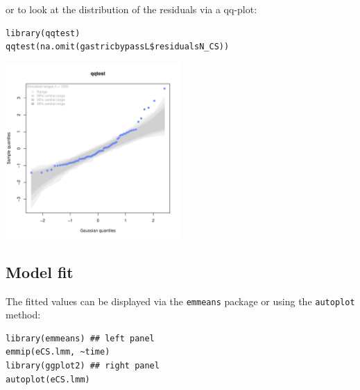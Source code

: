 \documentclass[12pt]{article}
\begin{document}
or to look at the distribution of the residuals via a qq-plot:
\lstset{language=r,label= ,caption= ,captionpos=b,numbers=none}
\begin{lstlisting}
library(qqtest)
qqtest(na.omit(gastricbypassL$residualsN_CS))
\end{lstlisting}
\begin{center}
\includegraphics[width=0.5\textwidth]{./figures/diag-qqplot.pdf}
\end{center}

\subsection{Model fit}
\label{sec:org845e703}

The fitted values can be displayed via the \texttt{emmeans} package or using the \texttt{autoplot} method:
\lstset{language=r,label= ,caption= ,captionpos=b,numbers=none}
\begin{lstlisting}
library(emmeans) ## left panel
emmip(eCS.lmm, ~time)
library(ggplot2) ## right panel
autoplot(eCS.lmm)
\end{lstlisting}
\end{document}
